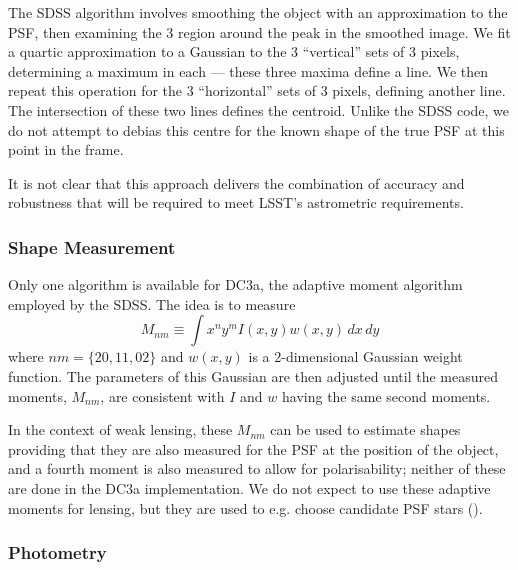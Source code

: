 The SDSS algorithm involves smoothing the object with an approximation to the PSF, then examining
the 3 region around the peak in the smoothed image.  We fit a quartic approximation to
a Gaussian to the 3 ``vertical'' sets of 3 pixels, determining a maximum in each --- these three
maxima define a line.  We then repeat this operation for the 3 ``horizontal'' sets of 3 pixels,
defining another line.  The intersection of these two lines defines the centroid.  Unlike the
SDSS code, we do not attempt to debias this centre for the known shape of the true PSF at this
point in the frame.

It is not clear that this approach delivers the combination of accuracy and robustness that will be required to meet
LSST's astrometric requirements.

\subsubsection{Shape Measurement}

Only one algorithm is available for DC3a, the adaptive moment algorithm
employed by the SDSS.  The idea is to measure
$$
M_{nm} \equiv \int x^n y^m I(x, y) w(x, y) \,dx\,dy
$$
where $nm = \{20, 11, 02\}$ and $w(x, y)$ is a 2-dimensional Gaussian weight function.  The
parameters of this Gaussian are then adjusted until the measured
moments, $M_{nm}$, are consistent with $I$ and $w$ having the same second moments.

In the context of weak lensing, these $M_{nm}$ can be used to estimate shapes providing
that they are also measured for the PSF at the position of the object, and a fourth
moment is also measured to allow for polarisability;  neither of these are done in the
DC3a implementation.   We do not expect to use these adaptive moments for lensing, but
they are used to e.g. choose candidate PSF stars ().

\subsubsection{Photometry}

